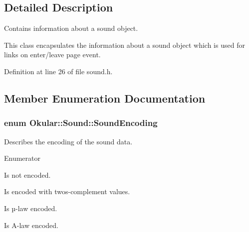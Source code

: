 \subsection{Detailed Description}
Contains information about a sound object. 

This class encapsulates the information about a sound object which is used for links on enter/leave page event. 

Definition at line 26 of file sound.\+h.



\subsection{Member Enumeration Documentation}
\hypertarget{classOkular_1_1Sound_a4bc04dce6aa25c5aadb2f93d0fafe5f8}{
\subsubsection[{Sound\+Encoding}]{\setlength{\rightskip}{0pt plus 5cm}enum {\bf Okular\+::\+Sound\+::\+Sound\+Encoding}}}\label{classOkular_1_1Sound_a4bc04dce6aa25c5aadb2f93d0fafe5f8}
Describes the encoding of the sound data. \begin{Desc}
\item[Enumerator]\par
\begin{description}
\item[{\em 
\hypertarget{classOkular_1_1Sound_a4bc04dce6aa25c5aadb2f93d0fafe5f8a10d7500cc3f7778181b9850512b0507a}{Raw}\label{classOkular_1_1Sound_a4bc04dce6aa25c5aadb2f93d0fafe5f8a10d7500cc3f7778181b9850512b0507a}
}]Is not encoded. \item[{\em 
\hypertarget{classOkular_1_1Sound_a4bc04dce6aa25c5aadb2f93d0fafe5f8ad923ae0ea21dd58a4b1e7d380b8daf59}{Signed}\label{classOkular_1_1Sound_a4bc04dce6aa25c5aadb2f93d0fafe5f8ad923ae0ea21dd58a4b1e7d380b8daf59}
}]Is encoded with twos-\/complement values. \item[{\em 
\hypertarget{classOkular_1_1Sound_a4bc04dce6aa25c5aadb2f93d0fafe5f8a99878763f9826b226f11ca376739c9af}{mu\+Law}\label{classOkular_1_1Sound_a4bc04dce6aa25c5aadb2f93d0fafe5f8a99878763f9826b226f11ca376739c9af}
}]Is µ-\/law encoded. \item[{\em 
\hypertarget{classOkular_1_1Sound_a4bc04dce6aa25c5aadb2f93d0fafe5f8a6ef006851290e544293f6305886d6b07}{A\+Law}\label{classOkular_1_1Sound_a4bc04dce6aa25c5aadb2f93d0fafe5f8a6ef006851290e544293f6305886d6b07}
}]Is A-\/law encoded. \end{description}
\end{Desc}


